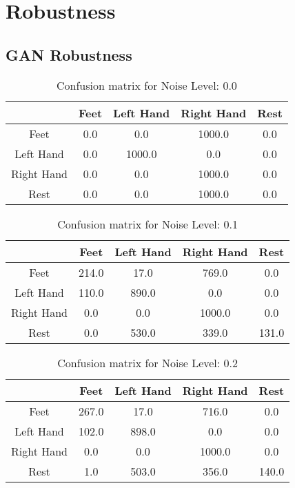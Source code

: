 \chapter{Robustness}\label{app:robustness}

\section{GAN Robustness}\label{app:gan_robustness}
\begin{table}[!htbp]
    \centering
    \begin{tabular}{|c||c|c|c|c|}
        \hline
		 & Feet & Left Hand & Right Hand & Rest \\
        \hline
        \hline
        Feet & 0.0 & 0.0 & 1000.0 & 0.0 \\
        \hline
        Left Hand & 0.0 & 1000.0 & 0.0 & 0.0 \\
        \hline
        Right Hand & 0.0 & 0.0 & 1000.0 & 0.0 \\
        \hline
        Rest & 0.0 & 0.0 & 1000.0 & 0.0 \\
        \hline
    \end{tabular}
    \caption{Confusion matrix for Noise Level: 0.0}
\end{table}

\begin{table}[!htbp]
    \centering
    \begin{tabular}{|c||c|c|c|c|}
        \hline
		 & Feet & Left Hand & Right Hand & Rest \\
        \hline
        \hline
        Feet & 214.0 & 17.0 & 769.0 & 0.0 \\
        \hline
        Left Hand & 110.0 & 890.0 & 0.0 & 0.0 \\
        \hline
        Right Hand & 0.0 & 0.0 & 1000.0 & 0.0 \\
        \hline
        Rest & 0.0 & 530.0 & 339.0 & 131.0 \\
        \hline
    \end{tabular}
    \caption{Confusion matrix for Noise Level: 0.1}
\end{table}

\begin{table}[!htbp]
    \centering
    \begin{tabular}{|c||c|c|c|c|}
        \hline
		 & Feet & Left Hand & Right Hand & Rest \\
        \hline
        \hline
        Feet & 267.0 & 17.0 & 716.0 & 0.0 \\
        \hline
        Left Hand & 102.0 & 898.0 & 0.0 & 0.0 \\
        \hline
        Right Hand & 0.0 & 0.0 & 1000.0 & 0.0 \\
        \hline
        Rest & 1.0 & 503.0 & 356.0 & 140.0 \\
        \hline
    \end{tabular}
    \caption{Confusion matrix for Noise Level: 0.2}
\end{table}

